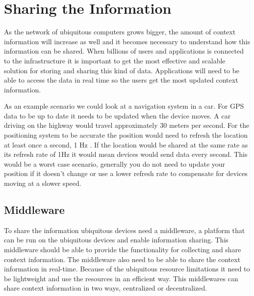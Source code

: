 \section{Sharing the Information}
As the network of ubiquitous computers grows bigger, the amount of context information will increase as well and it becomes necessary to understand how this information can be shared. When billions of users and applications is connected to the infrastructure it is important to get the most effective and scalable solution for storing and sharing this kind of data. Applications will need to be able to access the data in real time so the users get the most updated context information. 

As an example scenario we could look at a navigation system in a car. For GPS data to be up to date it needs to be updated when the device moves. A car driving on the highway would travel approximately 30 meters per second. For the positioning system to be accurate the position would need to refresh the location at least once a second, 1 Hz \cite{portas2010validity}. If the location would be shared at the same rate as its refresh rate of 1Hz it would mean devices would send data every second. This would be a worst case scenario, generally you do not need to update your position if it doesn't change or use a lower refresh rate to compensate for devices moving at a slower speed.

\subsection{Middleware}
To share the information ubiquitous devices need a middleware, a platform that can be run on the ubiquitous devices and enable information sharing. This middleware should be able to provide the functionality for collecting and share context information. The middleware also need to be able to share the context information in real-time. Because of the ubiquitous resource limitations it need to be lightweight and use the resources in an efficient way. This middlewares can share context information in two ways, centralized or decentralized.

